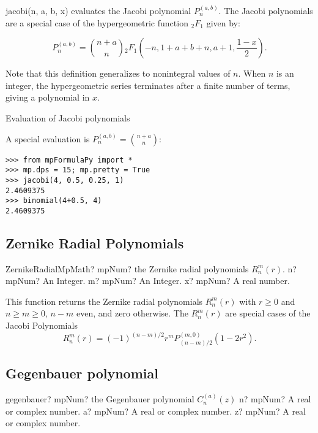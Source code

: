 jacobi(n, a, b, x) evaluates the Jacobi polynomial $P_n^{(a,b)}$. The Jacobi polynomials are a special case of the hypergeometric function ${}_2F_1$ given by:

\begin{equation}
P_n^{(a,b)} = \binom{n+a}{n}{}_2F_1\left(-n, 1+a+b+n, a+1, \frac{1-x}{2} \right).
\end{equation}

Note that this definition generalizes to nonintegral values of $n$. When $n$ is an integer, the hypergeometric series terminates after a finite number of terms, giving a polynomial in $x$.

Evaluation of Jacobi polynomials

A special evaluation is $P_n^{(a,b)} = \binom{n+a}{n}$:

\begin{lstlisting}
>>> from mpFormulaPy import *
>>> mp.dps = 15; mp.pretty = True
>>> jacobi(4, 0.5, 0.25, 1)
2.4609375
>>> binomial(4+0.5, 4)
2.4609375
\end{lstlisting}




\subsection{Zernike Radial Polynomials}

\begin{mpFunctionsExtract}
	\mpFunctionThreeNotImplemented
	{ZernikeRadialMpMath? mpNum? the Zernike radial polynomials $R^m_n(r)$.}
	{n? mpNum? An Integer.}
	{m? mpNum? An Integer.}
	{x? mpNum? A real number.}
\end{mpFunctionsExtract}

\vspace{0.3cm}
This function returns the Zernike radial polynomials $R^m_n(r)$ with $r\geq 0$ and $n\geq m \geq 0$, $n-m$ even, and zero otherwise. The  $R^m_n(r)$ are special cases of the Jacobi Polynomials
\begin{equation}
R^m_n(r) = (-1)^{(n-m)/2} r^m P^{(m,0)}_{(n-m)/2} (1-2r^2).
\end{equation}





\subsection{Gegenbauer polynomial}

\begin{mpFunctionsExtract}
	\mpFunctionThree
	{gegenbauer? mpNum? the Gegenbauer polynomial $C_n^{(a)}(z)$}
	{n? mpNum? A real or complex number.}
	{a? mpNum? A real or complex number.}	
	{z? mpNum? A real or complex number.}		
\end{mpFunctionsExtract}

